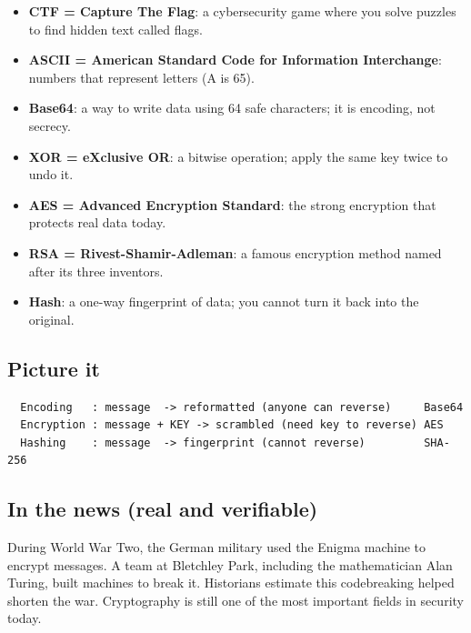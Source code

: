 \documentclass[12pt,openany]{book}
\begin{document}
\begin{itemize}

  \item \textbf{CTF = Capture The Flag}: a cybersecurity game where you solve puzzles to find hidden text called flags.

  \item \textbf{ASCII = American Standard Code for Information Interchange}: numbers that represent letters (A is 65).

  \item \textbf{Base64}: a way to write data using 64 safe characters; it is encoding, not secrecy.

  \item \textbf{XOR = eXclusive OR}: a bitwise operation; apply the same key twice to undo it.

  \item \textbf{AES = Advanced Encryption Standard}: the strong encryption that protects real data today.

  \item \textbf{RSA = Rivest-Shamir-Adleman}: a famous encryption method named after its three inventors.

  \item \textbf{Hash}: a one-way fingerprint of data; you cannot turn it back into the original.

\end{itemize}

\medskip

\subsection*{Picture it}


\begin{lstlisting}
  Encoding   : message  -> reformatted (anyone can reverse)     Base64
  Encryption : message + KEY -> scrambled (need key to reverse) AES
  Hashing    : message  -> fingerprint (cannot reverse)         SHA-256
\end{lstlisting}

\medskip

\subsection*{In the news (real and verifiable)}


During World War Two, the German military used the Enigma machine to encrypt messages. A team at Bletchley Park, including the mathematician Alan Turing, built machines to break it. Historians estimate this codebreaking helped shorten the war. Cryptography is still one of the most important fields in security today.
\end{document}
